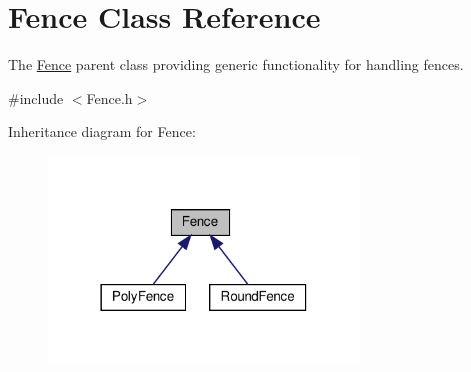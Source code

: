 \hypertarget{class_fence}{}\section{Fence Class Reference}
\label{class_fence}


The \hyperlink{class_fence}{Fence} parent class providing generic functionality for handling fences.  




{\ttfamily \#include $<$Fence.\+h$>$}



Inheritance diagram for Fence\+:
\nopagebreak
\begin{figure}[H]
\begin{center}
\leavevmode
\includegraphics[width=234pt]{dc/d62/class_fence__inherit__graph}
\end{center}
\end{figure}
